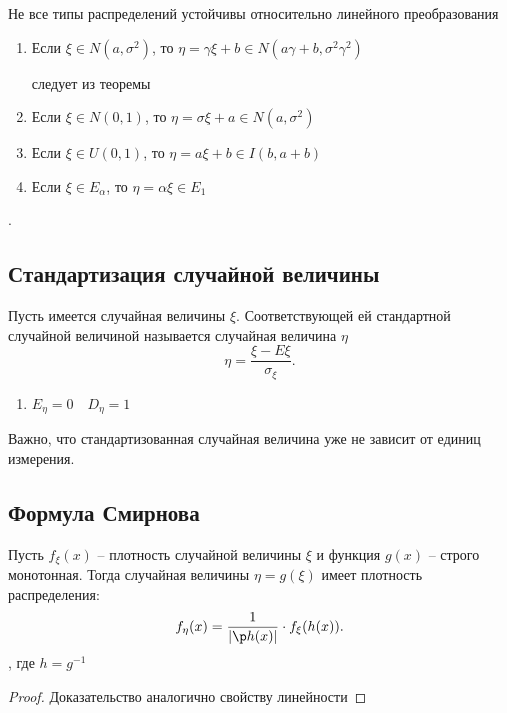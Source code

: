 \begin{note}
    Не все типы распределений устойчивы относительно линейного преобразования

    \begin{enumerate}
        \item Если $\xi\in N\left( a, \sigma^2 \right) $, то $\eta = \gamma \xi + b \in N\left( a\gamma + b, \sigma^2\gamma^2 \right) $

            следует из теоремы
        \item Если $\xi\in N\left( 0,1 \right) $, то $\eta = \sigma \xi + a\in N\left( a, \sigma^2 \right) $ 
        \item Если $\xi\in U\left( 0,1 \right) $, то $\eta = a\xi + b\in I\left( b, a+b \right) $
        \item Если $\xi\in E_{\alpha}$, то  $\eta = \alpha\xi\in E_1$
    \end{enumerate}.
\end{note}

\subsection{Стандартизация случайной величины}

\begin{definition}
    Пусть имеется случайная величины $\xi$. Соответствующей ей стандартной случайной величиной называется случайная величина $\eta$
     \[
    \eta = \frac{\xi - E\xi}{\sigma_\xi}
    .\] 
\end{definition}

\begin{property}
    \begin{enumerate}
        \item $E_\eta = 0\quad D_\eta = 1$
    \end{enumerate}
\end{property}

\begin{note}
    Важно, что стандартизованная случайная величина уже не зависит от единиц измерения.
\end{note}

\subsection{Формула Смирнова}

\begin{theorem}
    Пусть $f_\xi(x)$ -- плотность случайной величины  $\xi$ и функция  $g(x)$ -- строго монотонная. Тогда случайная величины  $\eta = g(\xi)$ имеет плотность распределения:
     \[
         f_\eta(x) = \frac{1}{|\p h(x)|}\cdot f_\xi(h(x))
     .\] , где $h = g^{-1}$ 
\end{theorem}
\begin{proof}
    Доказательство аналогично свойству линейности
\end{proof}

